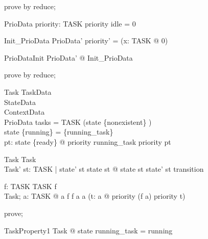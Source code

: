 \begin{zproof}[ContextDataInit]
prove by reduce;
\end{zproof}

\begin{schema}{PrioData}
  priority: TASK \fun  \nat 
\where
  priority idle = 0
\end{schema}

\begin{schema}{Init\_PrioData}
  PrioData'
\where
  priority' = (\lambda  x: TASK @ 0)
\end{schema}

\begin{theorem}{PrioDataInit}
\exists  PrioData' @ Init\_PrioData
\end{theorem}

\begin{zproof}[PrioDataInit]
prove by reduce;
\end{zproof}

\begin{schema}{Task}
  TaskData\\
  StateData\\
  ContextData\\
  PrioData
\where
  tasks = TASK \setminus  (state \inv  \limg  \{nonexistent\} \rimg )\\
  state \inv  \limg  \{running\} \rimg  = \{running\_task\}\\
  \forall  pt: state \inv  \limg  \{ready\} \rimg  @ priority running\_task \geq  priority pt
\end{schema}

\begin{schema}{\Delta Task}
  Task\\
  Task'
\where
  \forall  st: TASK | state' st \neq  state st @ state st \mapsto  state' st \in  transition
\end{schema}

\begin{axdef}
  f: \power  TASK \pfun  TASK
\where
  \emptyset \notin  \dom  f\\
    \forall  Task; a: \power  TASK @ a \in  \dom  f \land  f a \in  a \land  (\forall  t: a @ priority (f a) \geq  priority t)
\end{axdef}

\begin{zproof}[f\$domainCheck]
prove;
\end{zproof}

\begin{theorem}{TaskProperty1}
\forall  Task @ state running\_task = running
\end{theorem}

